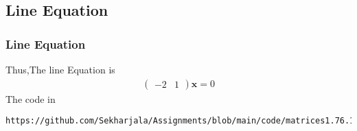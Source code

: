 \documentclass{beamer}
\theoremstyle{remark}
\newcommand{\myvec}[1]{\ensuremath{\begin{pmatrix}#1\end{pmatrix}}}
\let\vec\mathbf
\numberwithin{equation}{section}
\begin{document}
\subsection{Line Equation}
\begin{frame}[fragile]
\frametitle{Line Equation}

Thus,The line Equation is
\begin{align}
    \myvec{-2&1} \vec{x}=0 
\end{align}
The code in 
{\footnotesize
\begin{lstlisting}
https://github.com/Sekharjala/Assignments/blob/main/code/matrices1.76.1.py
\end{lstlisting}
}
%
\end{frame}
%
%  
%
%
\end{document}
